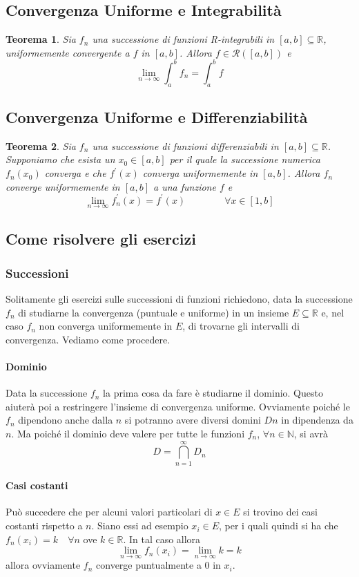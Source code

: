 \documentclass[a4paper,12pt]{article}
\newcommand{\Rint}{\mathcal{R}}
\newtheorem{teo}{Teorema}
\begin{document}
\subsection{Convergenza Uniforme e Integrabilità}
\begin{teo}
Sia ${f_n}$ una successione di funzioni R-integrabili in $[a,b]\subseteq \mathbb{R}$, uniformemente convergente a $f$ in $[a,b]$. Allora $f\in \Rint([a,b])$ e
$$\lim_{n\to\infty}\int_{a}^{b} f_n=\int_{a}^{b}f$$
\end{teo}
\subsection{Convergenza Uniforme e Differenziabilità}
\begin{teo}
Sia $f_n$ una successione di funzioni differenziabili in  $[a,b]\subseteq \mathbb{R}$. Supponiamo che esista un $x_{0} \in [a,b] $ per il quale la successione numerica ${f_n(x_0)}$ converga e che ${f^{'}(x)}$ converga uniformemente in $[a,b]$. Allora ${f_n}$ converge uniformemente in $[a,b]$ a una funzione $f$ e
$$\lim_{n\to\infty} f^{'}_n (x)=f^{'}(x) \qquad \qquad \forall x \in [1,b]$$
\end{teo}

\subsection{Come risolvere gli esercizi}

\subsubsection{Successioni}
Solitamente gli esercizi sulle successioni di funzioni richiedono, data la successione ${f_n}$ di studiarne la convergenza (puntuale e uniforme) in un insieme $E\subseteq \mathbb{R}$ e, nel caso $f_n$ non converga uniformemente in $E$, di trovarne gli intervalli di convergenza. Vediamo come procedere.
\paragraph*{Dominio}
Data la successione ${f_n}$ la prima cosa da fare è studiarne il dominio. Questo aiuterà poi a restringere l'insieme di convergenza uniforme. Ovviamente poiché le $f_n$ dipendono anche dalla $n$ si potranno avere diversi domini $Dn$ in dipendenza da $n$. Ma poiché il dominio deve valere per tutte le funzioni $f_n$, $\forall n\in\mathbb{N}$, si avrà
$$D=\displaystyle\bigcap_{n=1}^{\infty} D_n$$
\paragraph*{Casi costanti}
Può succedere che per alcuni valori particolari di $x\in E$ si trovino dei casi costanti rispetto a $n$. Siano essi ad esempio $x_i \in E$, per i quali quindi si ha che $f_n(x_i)=k \quad \forall n$  ove $k\in \mathbb{R}$. In tal caso allora 
$$\lim_{n\to\infty} f_n(x_i)=\lim_{n\to\infty} k = k $$
allora ovviamente $f_n$ converge puntualmente a $0$ in $x_i$.
\end{document}
